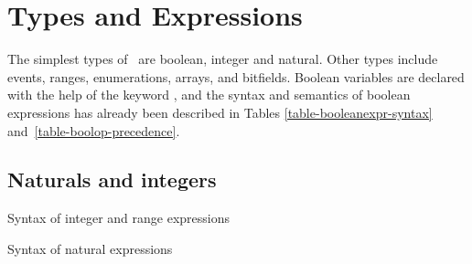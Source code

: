 {\section{Types and Expressions}
\label{sec-types}


The simplest types of \mocha\ are boolean, integer and natural.  Other
types include events, ranges, enumerations, arrays, and bitfields.
Boolean variables are declared with the help of the keyword \BOOL, and
the syntax and semantics of boolean expressions has already been
described in Tables \ref{table-booleanexpr-syntax}
and~\ref{table-boolop-precedence}.


\subsection{Naturals and integers}
\label{sec-nat-int}

\begin{table}
\caption{Syntax of integer and range expressions}
\label{table-intrange-expressions}
\end{table}

\begin{table}
\caption{Syntax of natural expressions}
\label{table-nat-expressions}
\end{table}

}

